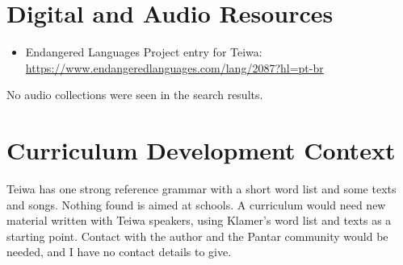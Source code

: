 \documentclass[12pt]{article}
\begin{document}
\section{Digital and Audio Resources}
\begin{itemize}
\item Endangered Languages Project entry for Teiwa: \url{https://www.endangeredlanguages.com/lang/2087?hl=pt-br}
\end{itemize}
No audio collections were seen in the search results.

\section{Curriculum Development Context}
Teiwa has one strong reference grammar with a short word list and some texts and songs. Nothing found is aimed at schools. A curriculum would need new material written with Teiwa speakers, using Klamer's word list and texts as a starting point. Contact with the author and the Pantar community would be needed, and I have no contact details to give.
\end{document}
